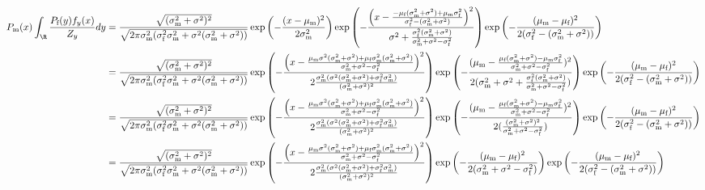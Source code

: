 \documentclass{article}\usepackage[]{graphicx}\usepackage[]{color}
\newcommand{\x}[1]{\text{#1}}
\begin{document}
\begin{landscape}
\begin{align*}
P_\x{m}(x)\int_\R \frac{P_\x{f}(y)f_y(x)}{Z_y} dy&=\frac{\sqrt{(\sigma_\x{m}^2+\sigma^2)^2}}{\sqrt{2\pi\sigma_\x{m}^2(\sigma_\x{f}^2\sigma_\x{m}^2+\sigma^2(\sigma_\x{m}^2+\sigma^2))}}\exp\left(-\frac{(x-\mu_\x{m})^2}{2\sigma_\x{m}^2}\right)\exp\left(-\frac{\left(x-\frac{-\mu_\x{f}(\sigma_\x{m}^2+\sigma^2)+\mu_\x{m}\sigma_\x{f}^2}{\sigma_\x{f}^2-(\sigma_\x{m}^2+\sigma^2)}\right)^2}{\sigma^2+\frac{\sigma_\x{f}^2(\sigma_\x{m}^2+\sigma^2)}{\sigma_\x{m}^2+\sigma^2-\sigma_\x{f}^2}}\right)\exp\left(-\frac{(\mu_\x{m}-\mu_\x{f})^2}{2(\sigma_\x{f}^2-(\sigma_\x{m}^2+\sigma^2))}\right)
\\&=\frac{\sqrt{(\sigma_\x{m}^2+\sigma^2)^2}}{\sqrt{2\pi\sigma_\x{m}^2(\sigma_\x{f}^2\sigma_\x{m}^2+\sigma^2(\sigma_\x{m}^2+\sigma^2))}}\exp\left(-\frac{\left(x-\frac{\mu_\x{m}\sigma^2(\sigma_\x{m}^2+\sigma^2)+\mu_\x{f}\sigma_\x{m}^2(\sigma_\x{m}^2+\sigma^2)}{\sigma_\x{m}^2+\sigma^2-\sigma_\x{f}^2}\right)^2}{2\frac{\sigma_\x{m}^2(\sigma^2(\sigma_\x{m}^2+\sigma^2)+\sigma_\x{f}^2\sigma_\x{m}^2)}{(\sigma_\x{m}^2+\sigma^2)^2}}\right)\exp\left(-\frac{(\mu_\x{m}-\frac{\mu_\x{f}(\sigma_\x{m}^2+\sigma^2)-\mu_\x{m}\sigma_\x{f}^2}{\sigma_\x{m}^2+\sigma^2-\sigma_\x{f}^2})^2}{2(\sigma_\x{m}^2+\sigma^2+\frac{\sigma_\x{f}^2(\sigma_\x{m}^2+\sigma^2)}{\sigma_\x{m}^2+\sigma^2-\sigma_\x{f}^2})}\right)\exp\left(-\frac{(\mu_\x{m}-\mu_\x{f})^2}{2(\sigma_\x{f}^2-(\sigma_\x{m}^2+\sigma^2))}\right)
\\&=\frac{\sqrt{(\sigma_\x{m}^2+\sigma^2)^2}}{\sqrt{2\pi\sigma_\x{m}^2(\sigma_\x{f}^2\sigma_\x{m}^2+\sigma^2(\sigma_\x{m}^2+\sigma^2))}}\exp\left(-\frac{\left(x-\frac{\mu_\x{m}\sigma^2(\sigma_\x{m}^2+\sigma^2)+\mu_\x{f}\sigma_\x{m}^2(\sigma_\x{m}^2+\sigma^2)}{\sigma_\x{m}^2+\sigma^2-\sigma_\x{f}^2}\right)^2}{2\frac{\sigma_\x{m}^2(\sigma^2(\sigma_\x{m}^2+\sigma^2)+\sigma_\x{f}^2\sigma_\x{m}^2)}{(\sigma_\x{m}^2+\sigma^2)^2}}\right)\exp\left(-\frac{(\mu_\x{m}-\frac{\mu_\x{f}(\sigma_\x{m}^2+\sigma^2)-\mu_\x{m}\sigma_\x{f}^2}{\sigma_\x{m}^2+\sigma^2-\sigma_\x{f}^2})^2}{2(\frac{(\sigma_\x{m}^2+\sigma^2)^2}{\sigma_\x{m}^2+\sigma^2-\sigma_\x{f}^2})}\right)\exp\left(-\frac{(\mu_\x{m}-\mu_\x{f})^2}{2(\sigma_\x{f}^2-(\sigma_\x{m}^2+\sigma^2))}\right)
\\&=\frac{\sqrt{(\sigma_\x{m}^2+\sigma^2)^2}}{\sqrt{2\pi\sigma_\x{m}^2(\sigma_\x{f}^2\sigma_\x{m}^2+\sigma^2(\sigma_\x{m}^2+\sigma^2))}}\exp\left(-\frac{\left(x-\frac{\mu_\x{m}\sigma^2(\sigma_\x{m}^2+\sigma^2)+\mu_\x{f}\sigma_\x{m}^2(\sigma_\x{m}^2+\sigma^2)}{\sigma_\x{m}^2+\sigma^2-\sigma_\x{f}^2}\right)^2}{2\frac{\sigma_\x{m}^2(\sigma^2(\sigma_\x{m}^2+\sigma^2)+\sigma_\x{f}^2\sigma_\x{m}^2)}{(\sigma_\x{m}^2+\sigma^2)^2}}\right)\exp\left(-\frac{(\mu_\x{m}-\mu_\x{f})^2}{2(\sigma_\x{m}^2+\sigma^2-\sigma_\x{f}^2)}\right)\exp\left(-\frac{(\mu_\x{m}-\mu_\x{f})^2}{2(\sigma_\x{f}^2-(\sigma_\x{m}^2+\sigma^2))}\right)

\end{align*}
\end{landscape}
\end{document}

